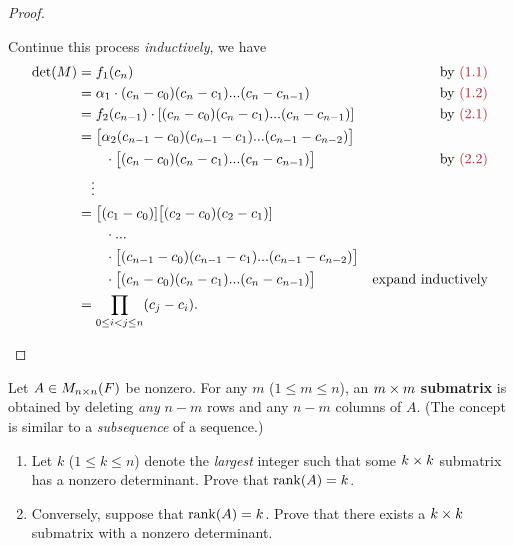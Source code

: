 \begin{proof}
\begin{enumerate}
Continue this process \emph{inductively}, we have
\begin{align*}
    \det(M) & = f_1(c_n) & \text{by \MAROON{(1.1)}} \\
            & = \alpha_1 \cdot (c_n - c_0) (c_n - c_1) ... (c_n - c_{n - 1}) & \text{by \MAROON{(1.2)}} \\
            & = f_2(c_{n - 1}) \cdot [(c_n - c_0) (c_n - c_1) ... (c_n - c_{n - 1})] & \text{by \MAROON{(2.1)}} \\
            & = \big[ \alpha_2 (c_{n - 1} - c_0) (c_{n - 1} - c_1) ... (c_{n - 1} - c_{n - 2}) \big] \\
            & \quad \quad \cdot \big[ (c_n - c_0) (c_n - c_1) ... (c_n - c_{n - 1}) \big] & \text{by \MAROON{(2.2)}} \\
            & \quad \vdots \\
            & = \big[(c_1 - c_0)] \big[(c_2 - c_0) (c_2 - c_1) ] \\
            & \quad \quad \cdot ... \\
            & \quad \quad \cdot \big[ (c_{n - 1} - c_0) (c_{n - 1} - c_1) ... (c_{n - 1} - c_{n - 2}) \big] \\
            & \quad \quad \cdot \big[ (c_n - c_0) (c_n - c_1) ... (c_n - c_{n - 1}) \big] & \text{expand inductively} \\
            & = \prod_{0 \le i < j \le n} (c_j - c_i).
\end{align*}
\end{enumerate}
\end{proof}

\begin{exercise} \label{exercise 4.3.23}
Let \(A \in M_{n \times n}(F)\) be nonzero.
For any \(m\) (\(1 \le m \le n\)), an \(m \times m\) \textbf{submatrix} is obtained by deleting \emph{any} \(n - m\) rows and any \(n - m\) columns of \(A\).
(The concept is similar to a \emph{subsequence} of a sequence.)
\begin{enumerate}
\item Let \(k\) (\(1 \le k \le n\)) denote the \emph{largest} integer such that some \(k \times k\) submatrix has a nonzero determinant.
Prove that \(\mathrm{rank}(A) = k\).
\item Conversely, suppose that \(\mathrm{rank}(A) = k\).
Prove that there exists a \(k \times k\) submatrix with a nonzero determinant.
\end{enumerate}
\end{exercise}

